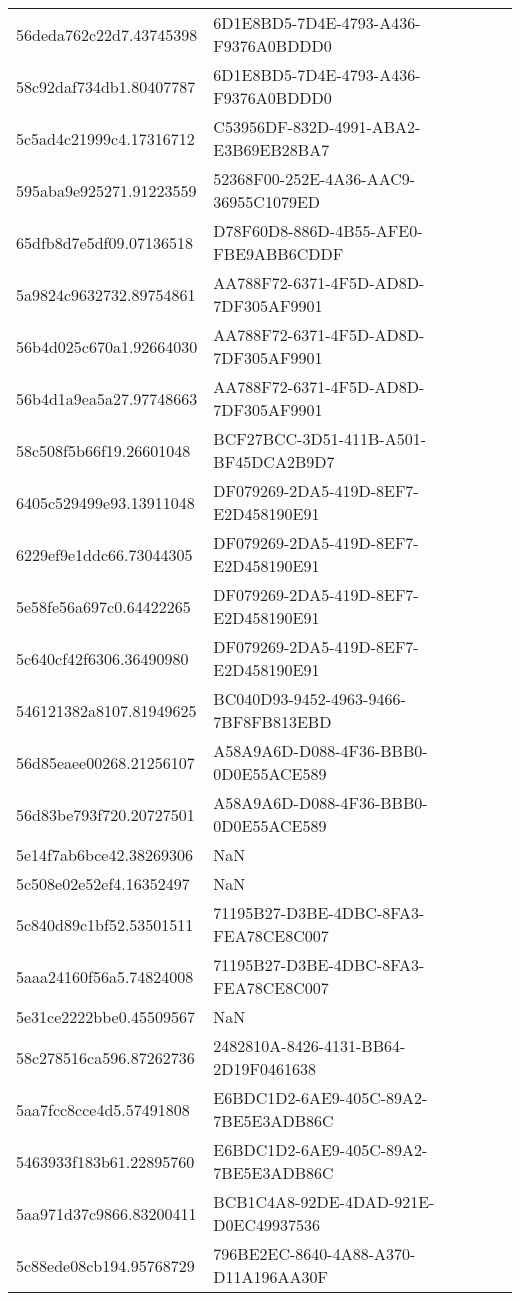 \begin{tabular}{ll}
56deda762c22d7.43745398 & 6D1E8BD5-7D4E-4793-A436-F9376A0BDDD0 \\
58c92daf734db1.80407787 & 6D1E8BD5-7D4E-4793-A436-F9376A0BDDD0 \\
5c5ad4c21999c4.17316712 & C53956DF-832D-4991-ABA2-E3B69EB28BA7 \\
595aba9e925271.91223559 & 52368F00-252E-4A36-AAC9-36955C1079ED \\
65dfb8d7e5df09.07136518 & D78F60D8-886D-4B55-AFE0-FBE9ABB6CDDF \\
5a9824c9632732.89754861 & AA788F72-6371-4F5D-AD8D-7DF305AF9901 \\
56b4d025c670a1.92664030 & AA788F72-6371-4F5D-AD8D-7DF305AF9901 \\
56b4d1a9ea5a27.97748663 & AA788F72-6371-4F5D-AD8D-7DF305AF9901 \\
58c508f5b66f19.26601048 & BCF27BCC-3D51-411B-A501-BF45DCA2B9D7 \\
6405c529499e93.13911048 & DF079269-2DA5-419D-8EF7-E2D458190E91 \\
6229ef9e1ddc66.73044305 & DF079269-2DA5-419D-8EF7-E2D458190E91 \\
5e58fe56a697c0.64422265 & DF079269-2DA5-419D-8EF7-E2D458190E91 \\
5c640cf42f6306.36490980 & DF079269-2DA5-419D-8EF7-E2D458190E91 \\
546121382a8107.81949625 & BC040D93-9452-4963-9466-7BF8FB813EBD \\
56d85eaee00268.21256107 & A58A9A6D-D088-4F36-BBB0-0D0E55ACE589 \\
56d83be793f720.20727501 & A58A9A6D-D088-4F36-BBB0-0D0E55ACE589 \\
5e14f7ab6bce42.38269306 & NaN \\
5c508e02e52ef4.16352497 & NaN \\
5c840d89c1bf52.53501511 & 71195B27-D3BE-4DBC-8FA3-FEA78CE8C007 \\
5aaa24160f56a5.74824008 & 71195B27-D3BE-4DBC-8FA3-FEA78CE8C007 \\
5e31ce2222bbe0.45509567 & NaN \\
58c278516ca596.87262736 & 2482810A-8426-4131-BB64-2D19F0461638 \\
5aa7fcc8cce4d5.57491808 & E6BDC1D2-6AE9-405C-89A2-7BE5E3ADB86C \\
5463933f183b61.22895760 & E6BDC1D2-6AE9-405C-89A2-7BE5E3ADB86C \\
5aa971d37c9866.83200411 & BCB1C4A8-92DE-4DAD-921E-D0EC49937536 \\
5c88ede08cb194.95768729 & 796BE2EC-8640-4A88-A370-D11A196AA30F \\

\end{tabular}
